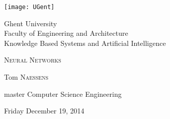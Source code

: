 \begin{titlepage}

\fontsize{12pt}{14pt}
\selectfont

\begin{center}
\texttt{[image: UGent]}

\vspace{1.5cm}
Ghent University \\
Faculty of Engineering and Architecture \\
Knowledge Based Systems and Artificial Intelligence \\


\vspace{4.0cm}

\fontsize{17.28pt}{21pt}
\selectfont

\textsc{{\Large Neural Networks}}

\fontsize{12pt}{14pt}
\selectfont

\vspace{.6cm}

{\Large 
	Tom \textsc{Naessens} \hfill \\
} 

\vspace{.6cm}

{ \large
	 master Computer Science Engineering
}

\vspace{0.4cm}

Friday December 19, 2014
\end{center}

\vspace{5.5cm}


\end{titlepage}

\thispagestyle{empty}

